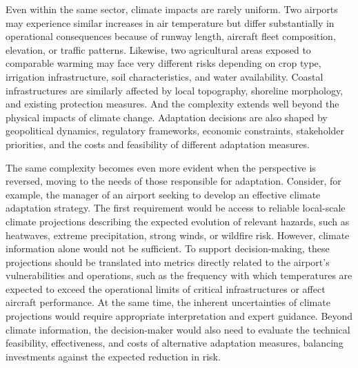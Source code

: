 Even within the same sector, climate impacts are rarely uniform. Two airports may experience similar increases in air temperature but differ substantially in operational consequences because of runway length, aircraft fleet composition, elevation, or traffic patterns. Likewise, two agricultural areas exposed to comparable warming may face very different risks depending on crop type, irrigation infrastructure, soil characteristics, and water availability. Coastal infrastructures are similarly affected by local topography, shoreline morphology, and existing protection measures. And the complexity extends well beyond the physical impacts of climate change. Adaptation decisions are also shaped by geopolitical dynamics, regulatory frameworks, economic constraints, stakeholder priorities, and the costs and feasibility of different adaptation measures.

The same complexity becomes even more evident when the perspective is reversed, moving to the needs of those responsible for adaptation. Consider, for example, the manager of an airport seeking to develop an effective climate adaptation strategy. The first requirement would be access to reliable local-scale climate projections describing the expected evolution of relevant hazards, such as heatwaves, extreme precipitation, strong winds, or wildfire risk. However, climate information alone would not be sufficient. To support decision-making, these projections should be translated into metrics directly related to the airport's vulnerabilities and operations, such as the frequency with which temperatures are expected to exceed the operational limits of critical infrastructures or affect aircraft performance. At the same time, the inherent uncertainties of climate projections would require appropriate interpretation and expert guidance.
Beyond climate information, the decision-maker would also need to evaluate the technical feasibility, effectiveness, and costs of alternative adaptation measures, balancing investments against the expected reduction in risk.

